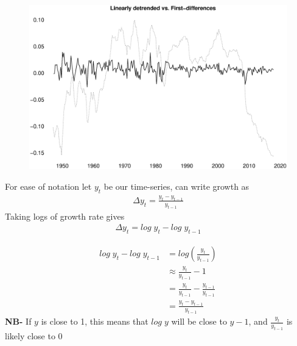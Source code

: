 \documentclass{beamer}
\begin{document}
\begin{frame}
  \begin{figure}
    \includegraphics[scale=.3]{first_differences.eps}
  \end{figure}
\end{frame}

\begin{frame}
 For ease of notation let $y_t$ be our time-series, can write growth as  
  \begin{align}
    \Delta y_t = \frac{y_t - y_{t-1}}{y_{t-1}}    
  \end{align}
  \medskip
  Taking logs of growth rate gives   
  \begin{align}
    \Delta y_t= log\; y_t - log\; y_{t-1}
  \end{align}    
\end{frame}

\begin{frame}  
  \begin{align}
    log\; y_t-log\; y_{t-1} &= log\left(\frac{y_t}{y_{t-1}}\right) \\ \nonumber
    & \approx \frac{y_t}{y_{t-1}}-1\\ \nonumber
    &= \frac{y_t}{y_{t-1}}-\frac{y_{t-1}}{y_{t-1}}\\ \nonumber
    &= \frac{y_t - y_{t-1}}{y_{t-1}}      
  \end{align}
  \medskip
  \textbf{NB-} If $y$ is close to 1, this means that $log\;y$ will be close to $y-1$, and $\frac{y_t}{y_{t-1}}$ is likely close to 0  
\end{frame}
\end{document}
